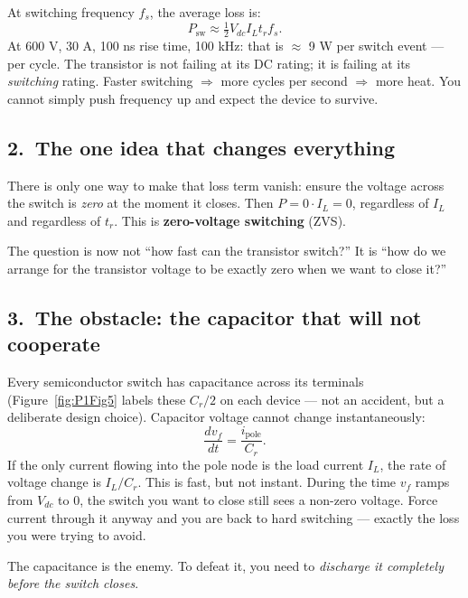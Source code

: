 \documentclass[12pt, a4paper]{article}
\def\,{ }%
\newcommand{\Vdc}{V_{dc}}
\newcommand{\vf}{v_f}
\newcommand{\IL}{I_L}
\newcommand{\Cr}{C_r}
\newcommand{\figref}[1]{Figure~\ref{#1}}
\begin{document}
At switching frequency $f_s$, the average loss is:
\[
    P_\text{sw} \approx \tfrac{1}{2}\,\Vdc\,\IL\,t_r\,f_s.
\]
At 600\,V, 30\,A, 100\,ns rise time, 100\,kHz: that is $\approx$\,9\,W per
switch event --- per cycle.
The transistor is not failing at its DC rating; it is failing at its
\emph{switching} rating.
Faster switching $\Rightarrow$ more cycles per second $\Rightarrow$ more heat.
You cannot simply push frequency up and expect the device to survive.

\subsection*{2.\ The one idea that changes everything}

There is only one way to make that loss term vanish:
ensure the voltage across the switch is \emph{zero} at the moment it closes.
Then $P = 0 \cdot \IL = 0$, regardless of $\IL$ and regardless of $t_r$.
This is \textbf{zero-voltage switching} (ZVS).

The question is now not ``how fast can the transistor switch?''
It is ``how do we arrange for the transistor voltage to be exactly zero when
we want to close it?''

\subsection*{3.\ The obstacle: the capacitor that will not cooperate}

Every semiconductor switch has capacitance across its terminals
(\figref{fig:P1Fig5} labels these $C_r/2$ on each device --- not an accident,
but a deliberate design choice).
Capacitor voltage cannot change instantaneously:
\[
    \frac{d\vf}{dt} = \frac{i_\text{pole}}{\Cr}.
\]
If the only current flowing into the pole node is the load current $\IL$,
the rate of voltage change is $\IL/\Cr$.
This is fast, but not instant.
During the time $\vf$ ramps from $\Vdc$ to $0$, the switch you want to
close still sees a non-zero voltage.
Force current through it anyway and you are back to hard switching ---
exactly the loss you were trying to avoid.

The capacitance is the enemy.
To defeat it, you need to \emph{discharge it completely before the switch
closes}.

\end{document}
